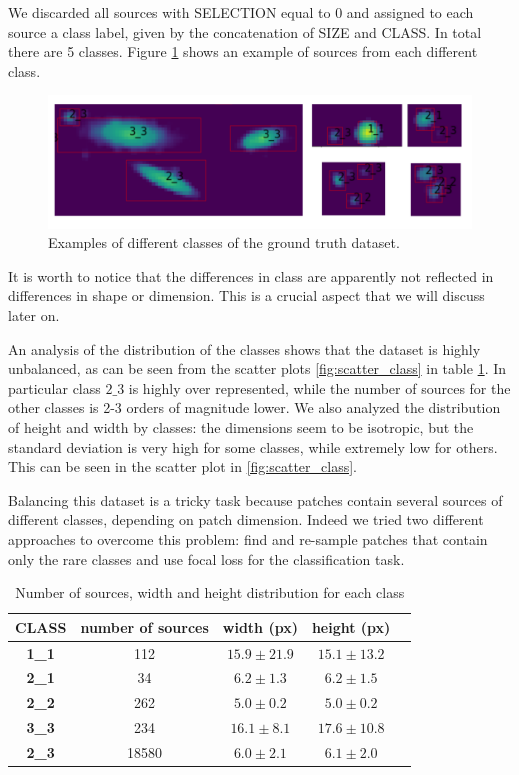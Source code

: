 \documentclass[a4paper,10pt]{report}
\begin{document}
We discarded all sources with SELECTION equal to 0 and assigned to each source a class label, given by the concatenation of SIZE and CLASS.
 In total there are 5 classes. Figure \ref{fig:class_examples} shows an example of sources from each different class. 
 \begin{figure}[h]
  \center
  \includegraphics[width=0.90\linewidth]{diff_classes_examples.png}
  \caption{Examples of different classes of the ground truth dataset.}
  \label{fig:class_examples}
\end{figure}

It is worth to notice that the differences in class are apparently not reflected in differences in shape or dimension. This is a crucial aspect that we will discuss later on.

An analysis of the distribution of the classes shows that the dataset is highly unbalanced, as can be seen from the scatter plots \ref{fig:scatter_class} in table \ref{table:class_analysis}. In particular class $2\_3$ is highly over represented, while the number of sources for the other classes is 2-3 orders of magnitude lower. We also analyzed the distribution of height and width by classes: the dimensions seem to be isotropic, but the standard deviation is very high for some classes, while extremely low for others. This can be seen in the scatter plot in \ref{fig:scatter_class}.

Balancing this dataset is a tricky task because patches contain several sources of different classes, depending on patch dimension. Indeed we tried two different approaches to overcome this problem: find and re-sample patches that contain only the rare classes and use focal loss for the classification task.
\begin{table}[h]
  \center
  \begin{tabular}{|c|c|c|c|c|}
    \hline
    \textbf{CLASS}& \textbf{number of sources} & \textbf{width (px)} & \textbf{height (px)} \\ 
    \hline
    \textbf{1_1} & 112 & $15.9\pm21.9$ & $15.1\pm13.2$ \\ 
    \hline
    \textbf{2_1} & 34 & $6.2\pm1.3$ & $6.2\pm1.5$ \\ 
    \hline
    \textbf{2_2} & 262 & $5.0\pm0.2$ & $5.0\pm0.2$ \\ 
    \hline
    \textbf{3_3} & 234 & $16.1\pm8.1$ & $17.6\pm10.8$ \\ 
    \hline
    \textbf{2_3} & 18580 & $6.0\pm2.1$ & $6.1\pm2.0$ \\ 
    \hline
  \end{tabular}
  \caption{Number of sources, width and height distribution for each class}
  \label{table:class_analysis}
\end{table}
\end{document}
